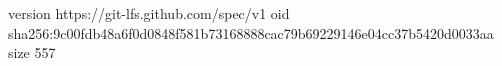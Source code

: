 version https://git-lfs.github.com/spec/v1
oid sha256:9c00fdb48a6f0d0848f581b73168888cac79b69229146e04cc37b5420d0033aa
size 557
